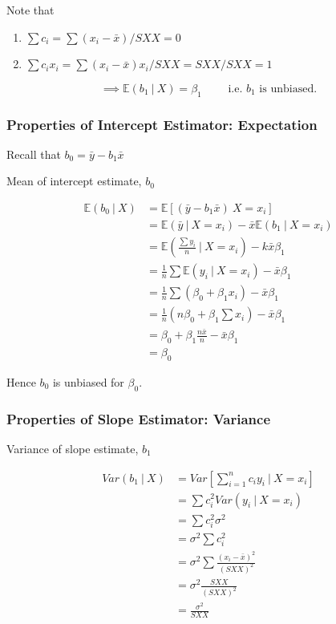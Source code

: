 \documentclass[11pt]{article}
\theoremstyle{definition}
\numberwithin{equation}{section}
\begin{document}
Note that
\begin{enumerate}
\item $\sum c_i = \sum(x_i-\bar{x}) / SXX = 0$
\item $\sum c_ix_i=\sum(x_i - \bar{x}) x_i / SXX = SXX / SXX = 1$
\end{enumerate}

\begin{equation}\label{b_1-unbiased}
  \implies \boxed{\mathbb{E}(b_1\>|\> X) = \beta_1}\qquad\text{ i.e. $b_1$ is unbiased.}
\end{equation}

\subsubsection{Properties of Intercept Estimator: Expectation}

Recall that $b_0 = \bar{y} - b_1\bar{x}$

Mean of intercept estimate, $b_0$

\begin{align*}
  \mathbb{E}(b_0\>|\>X) &= \mathbb{E}[(\bar{y} - b_1\bar{x})\> X = x_i]\\
  &= \mathbb{E}(\bar{y}\>|\>X = x_i) - \bar{x}\mathbb{E}(b_1\>|\>X = x_i)\\
  &= \mathbb{E}\left( \frac{\sum y_i}{n} \>|\> X = x_i \right) -k \bar{x}\beta_1\\
  &= \frac{1}{n}\sum\mathbb{E}(y_i \>|\> X=  x_i) - \bar{x}\beta_1\\
  &= \frac{1}{n}\sum(\beta_0+\beta_1x_i) - \bar{x}\beta_1\\
  &= \frac{1}{n}(n\beta_0 + \beta_1\sum x_i) - \bar{x}\beta_1\\
  &= \beta_0 + \beta_1\frac{n\bar{x}}{n} - \bar{x}\beta_1\\
  &= \beta_0
\end{align*}

Hence $b_0$ is unbiased for $\beta_0$.

\subsubsection{Properties of Slope Estimator: Variance}

Variance of slope estimate, $b_1$

\begin{align}
  Var(b_1\>|\>X) &= Var\left[ \sum^n_{i=1}c_iy_i \>|\> X = x_i \right]\\
  &= \sum c_i^2Var(y_i\>|\>X = x_i)\\
  &= \sum c_i^2\sigma^2\\
  &= \sigma^2 \sum c_i^2\\
  &=\sigma^2\sum\frac{(x_i - \bar{x})^2}{(SXX)^2}\\
  &= \sigma^2\frac{SXX}{(SXX)^2}\\
  &= \frac{\sigma^2}{SXX}
\end{align}
\end{document}
